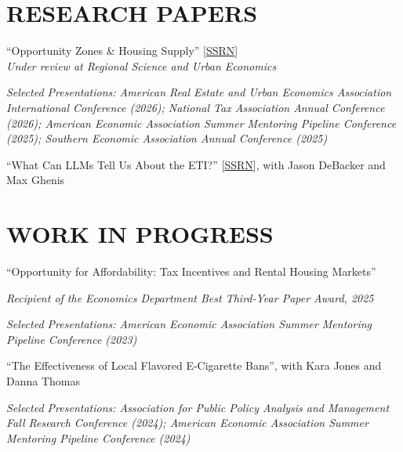 \documentclass[11pt,letterpaper]{article}
\begin{document}
\section*{RESEARCH PAPERS}
``Opportunity Zones \& Housing Supply'' [\href{https://papers.ssrn.com/sol3/papers.cfm?abstract_id=6776971}{SSRN}]  \\
\textit{Under review at Regional Science and Urban Economics}
\begin{list}{}{\setlength{\leftmargin}{0.1in}\setlength{\rightmargin}{0.5in}\setlength{\topsep}{4pt}}
\item {\itshape Selected Presentations: American Real Estate and Urban Economics Association International Conference (2026); National Tax Association Annual Conference (2026); American Economic Association Summer Mentoring Pipeline Conference (2025); Southern Economic Association Annual Conference (2025)}
\end{list}
\vspace{6pt}
``What Can LLMs Tell Us About the ETI?'' [\href{https://papers.ssrn.com/sol3/papers.cfm?abstract_id=5410643}{SSRN}], with Jason DeBacker and Max Ghenis

\section*{WORK IN PROGRESS}
``Opportunity for Affordability: Tax Incentives and Rental Housing Markets''
\begin{list}{}{\setlength{\leftmargin}{0.1in}\setlength{\rightmargin}{0.5in}\setlength{\topsep}{4pt}}
\item {\itshape Recipient of the Economics Department Best Third-Year Paper Award, 2025}
\end{list}
\begin{list}{}{\setlength{\leftmargin}{0.1in}\setlength{\rightmargin}{0.5in}\setlength{\topsep}{4pt}}
\item {\itshape Selected Presentations:  American Economic Association Summer Mentoring Pipeline Conference (2023)}
\end{list}
``The Effectiveness of Local Flavored E-Cigarette Bans'', with Kara Jones and Danna Thomas
\begin{list}{}{\setlength{\leftmargin}{0.1in}\setlength{\rightmargin}{0.5in}\setlength{\topsep}{4pt}}
\item {\itshape Selected Presentations: Association for Public Policy Analysis and Management Fall Research Conference (2024); American Economic Association Summer Mentoring Pipeline Conference (2024)}
\end{list}
\end{document}
